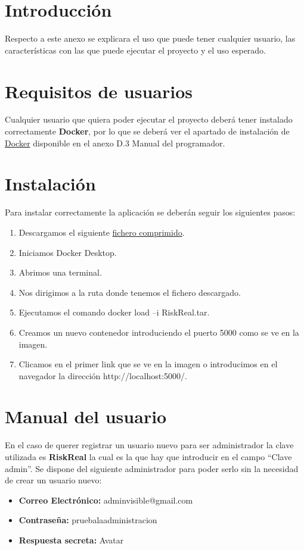 
\section{Introducción}
Respecto a este anexo se explicara el uso que puede tener cualquier usuario, las características  con las que puede ejecutar el proyecto y el uso esperado.
\section{Requisitos de usuarios}
Cualquier usuario que quiera poder ejecutar el proyecto deberá tener instalado correctamente \textbf{Docker}, por lo que se deberá ver el apartado de instalación de \hyperref[InstDocker]{Docker} disponible en el anexo D.3 Manual del programador. 
\section{Instalación}
Para instalar correctamente la aplicación se deberán seguir los siguientes pasos:

\begin{enumerate}
    \item Descargamos el siguiente \href{https://drive.google.com/file/d/1IkoLn0codu3tQItd_Ih4hI82Km6nmmN5/view?usp=sharing}{fichero comprimido}.
    \item Iniciamos Docker Desktop.
    \item Abrimos una terminal.
    \item Nos dirigimos a la ruta donde tenemos el fichero descargado.
    \item Ejecutamos el comando docker load –i RiskReal.tar.
    \item Creamos un nuevo contenedor introduciendo el puerto 5000 como se ve en la imagen.
    \item Clicamos en el primer link que se ve en la imagen o introducimos en el navegador la dirección http://localhost:5000/.
\end{enumerate}

\section{Manual del usuario}
En el caso de querer registrar un usuario nuevo para ser administrador la clave utilizada es \textbf{RiskReal} la cual es la que hay que introducir en el campo “Clave admin”. Se dispone del siguiente administrador para poder serlo sin la necesidad de crear un usuario nuevo:
\begin{itemize}
    \item \textbf{Correo Electrónico:} adminvisible@gmail.com
    \item \textbf{Contraseña:} pruebalaadministracion
    \item \textbf{Respuesta secreta:} Avatar
\end{itemize}

